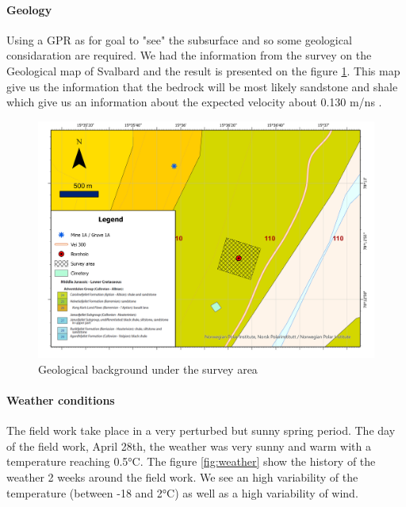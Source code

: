\paragraph{Geology} Using a GPR as for goal to "see" the subsurface and so some geological considaration are required. We had the information from the survey on the Geological map of Svalbard \cite{Atakan2015GeoscienceSvalbard} and the result is presented on the figure \ref{fig:GeologicalBackground}. This map give us the information that the bedrock will be most likely sandstone and shale which give us an information about the expected velocity about 0.130 m/ns \cite{GPRAnalysis}.

\begin{figure}
    \centering
    \includegraphics[width=\linewidth]{Images/00_Methodology/GeologicalSituationMap.jpg}
    \caption{Geological background under the survey area \cite{Atakan2015GeoscienceSvalbard}}
    \label{fig:GeologicalBackground}
\end{figure}

\paragraph{Weather conditions} The field work take place in a very perturbed but sunny spring period. The day of the field work, April 28th, the weather was very sunny and warm with a temperature reaching 0.5°C. The figure \ref{fig:weather} show the history of the weather 2 weeks around the field work. We see an high variability of the temperature (between -18 and 2°C) as well as a high variability of wind.

